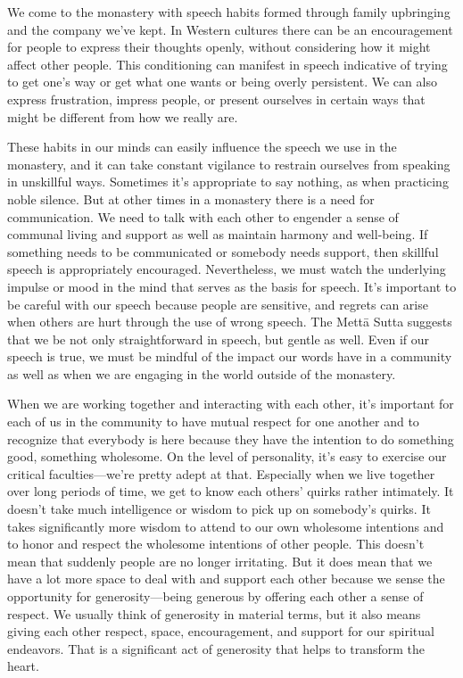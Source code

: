 We come to the monastery with speech habits formed through family 
upbringing and the company we've kept. In Western cultures there can be 
an encouragement for people to express their thoughts openly, without 
considering how it might affect other people. This conditioning can 
manifest in speech indicative of trying to get one's way or get what 
one wants or being overly persistent. We can also express frustration, 
impress people, or present ourselves in certain ways that might be 
different from how we really are.

These habits in our minds can easily influence the speech we use in the 
monastery, and it can take constant vigilance to restrain ourselves 
from speaking in unskillful ways. Sometimes it's appropriate to say 
nothing, as when practicing noble silence. But at other times in a 
monastery there is a need for communication. We need to talk with each 
other to engender a sense of communal living and support as well as 
maintain harmony and well-being. If something needs to be communicated 
or somebody needs support, then skillful speech is appropriately 
encouraged. Nevertheless, we must watch the underlying impulse or mood 
in the mind that serves as the basis for speech. It's important to be 
careful with our speech because people are sensitive, and regrets can 
arise when others are hurt through the use of wrong speech. The Mettā 
Sutta suggests that we be not only straightforward in speech, but 
gentle as well. Even if our speech is true, we must be mindful of the 
impact our words have in a community as well as when we are engaging in 
the world outside of the monastery.


When we are working together and interacting with each other, it's 
important for each of us in the community to have mutual respect for 
one another and to recognize that everybody is here because they have 
the intention to do something good, something wholesome. On the level 
of personality, it's easy to exercise our critical faculties---we're 
pretty adept at that. Especially when we live together over long 
periods of time, we get to know each others' quirks rather intimately. 
It doesn't take much intelligence or wisdom to pick up on somebody's 
quirks. It takes significantly more wisdom to attend to our own 
wholesome intentions and to honor and respect the wholesome intentions 
of other people. This doesn't mean that suddenly people are no longer 
irritating. But it does mean that we have a lot more space to deal with 
and support each other because we sense the opportunity for 
generosity---being generous by offering each other a sense of respect. 
We usually think of generosity in material terms, but it also means 
giving each other respect, space, encouragement, and support for our 
spiritual endeavors. That is a significant act of generosity that helps 
to transform the heart.

